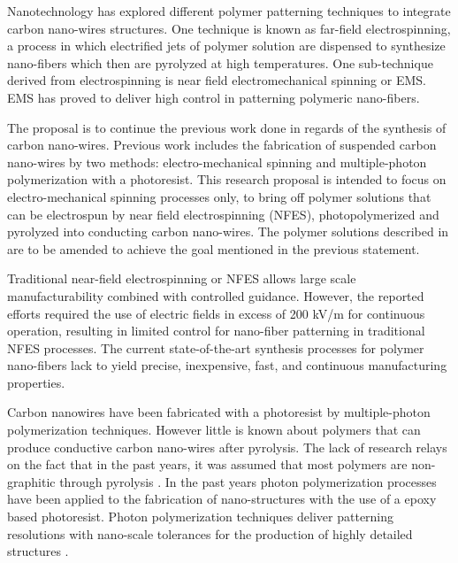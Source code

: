Nanotechnology has explored different polymer patterning techniques to integrate carbon nano-wires structures. One technique is known as far-field electrospinning, a process in which electrified jets of polymer solution are dispensed to synthesize nano-fibers which then are pyrolyzed at high temperatures. One sub-technique derived from electrospinning is near field electromechanical spinning or EMS. EMS has proved to deliver high control in patterning polymeric nano-fibers. \cite{Cardenas2017}

The proposal is to continue the previous work done in regards of the synthesis of carbon nano-wires. Previous work includes the fabrication of suspended carbon nano-wires by two methods: electro-mechanical spinning and multiple-photon polymerization with a photoresist. \cite{Cardenas2017} This research proposal is intended to focus on electro-mechanical spinning processes only, to bring off polymer solutions that can be electrospun by near field electrospinning (NFES), photopolymerized and pyrolyzed into conducting carbon nano-wires. The polymer solutions described in \cite{Cardenas2017} are to be amended to achieve the goal mentioned in the previous statement.

Traditional near-field electrospinning or NFES allows large scale manufacturability combined with controlled guidance. \cite{Madou2011} However, the reported efforts required the use of electric fields in excess of 200 kV/m for continuous operation, resulting in limited control for nano-fiber patterning in traditional NFES processes. \cite{Madou2011} The current state-of-the-art synthesis processes for polymer nano-fibers lack to yield precise, inexpensive, fast, and continuous manufacturing properties.

Carbon nanowires have been fabricated with a photoresist by multiple-photon polymerization techniques. However little is known about polymers that can produce conductive carbon nano-wires after pyrolysis. The lack of research relays on the fact that in the past years, it was assumed that most polymers are non-graphitic through pyrolysis \cite{Franklin1951}. In the past years photon polymerization processes have been applied to the fabrication of nano-structures with the use of a epoxy based photoresist. \cite{Boer2014} Photon polymerization techniques deliver patterning resolutions with nano-scale tolerances for the production of highly detailed structures \cite{Hribar2014}.

